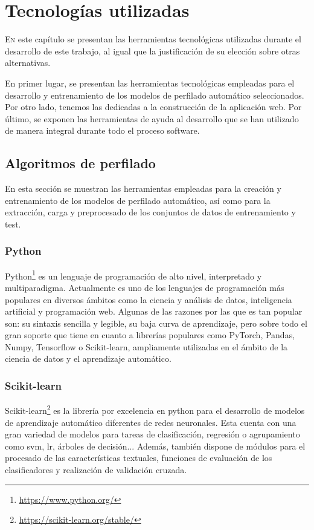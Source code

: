 \chapter{Tecnologías utilizadas}
\label{chap:tecnologias}

\lettrine{E}{n} este capítulo se presentan las herramientas tecnológicas utilizadas durante el desarrollo de este trabajo, al igual que la justificación de su elección sobre otras alternativas.

En primer lugar, se presentan las herramientas tecnológicas empleadas para el desarrollo y entrenamiento de los modelos de perfilado automático seleccionados. Por otro lado, tenemos las dedicadas a la construcción de la aplicación web. Por último, se exponen las herramientas de ayuda al desarrollo que se han utilizado de manera integral durante todo el proceso software.

\section{Algoritmos de perfilado}

En esta sección se muestran las herramientas empleadas para la creación y entrenamiento de los modelos de perfilado automático, así como para la extracción, carga y preprocesado de los conjuntos de datos de entrenamiento y test.

\subsection{Python}
\label{subsec:python}

Python\footnote{\url{https://www.python.org/}} es un lenguaje de programación de alto nivel, interpretado y multiparadigma. Actualmente es uno de los lenguajes de programación más populares en diversos ámbitos como la ciencia y análisis de datos, inteligencia artificial y programación web. Algunas de las razones por las que es tan popular son: su sintaxis sencilla y legible, su baja curva de aprendizaje, pero sobre todo el gran soporte que tiene en cuanto a librerías populares como PyTorch, Pandas, Numpy, Tensorflow o Scikit-learn, ampliamente utilizadas en el ámbito de la ciencia de datos y el aprendizaje automático.

\subsection{Scikit-learn}

Scikit-learn\footnote{\url{https://scikit-learn.org/stable/}} es la librería por excelencia en python para el desarrollo de modelos de aprendizaje automático diferentes de redes neuronales. Esta cuenta con una gran variedad de modelos para tareas de clasificación, regresión o agrupamiento como \gls{svm}, \gls{lr}, árboles de decisión... Además, también dispone de módulos para el procesado de las características textuales, funciones de evaluación de los clasificadores y realización de validación cruzada.

